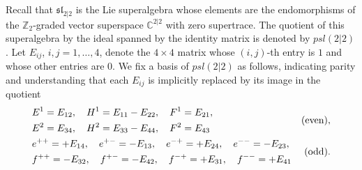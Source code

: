 \documentclass[10pt,a4paper]{amsart}
\numberwithin{equation}{section}
\newcommand{\fld}[1]{\mathbb{#1}} %
\newcommand{\alg}[1]{\mathfrak{#1}} %
\newcommand{\ZZ}{\fld{Z}}
\newcommand{\CC}{\fld{C}}
\newcommand{\SLSA}[3]{\alg{#1}_{#2 \vert #3}} %
\newcommand{\psl}{\SLSA{psl}{2}{2}}
\def\smash#1{#1}
\def\psl{psl(2|2)}
\begin{document}
Recall that \smash{$\SLSA{sl}{2}{2}$} is the Lie superalgebra whose elements are the endomorphisms of the $\ZZ_2$-graded vector superspace \smash{$\CC^{2\vert2}$} with zero supertrace.
The quotient of this superalgebra by the ideal spanned by the identity matrix is denoted by \smash{$\psl$}.
Let $E_{ij}$, $i,j=1,\dots,4$, denote the $4\times4$ matrix whose $(i,j)$-th entry is $1$ and whose other entries are $0$.
We fix a basis of \smash{$\psl$} as follows, indicating parity and understanding that each $E_{ij}$ is implicitly replaced by its image in the quotient%
\begin{equation}\label{eq:pslbasis}
	\begin{aligned}
	&	\begin{split}
			& E^1 = E_{12}, \quad H^1 = E_{11}-E_{22}, \quad F^1 = E_{21}, \\
			& E^2= E_{34}, \quad H^2 = E_{33}-E_{44}, \quad F^2 = E_{43}
		\end{split}
		& {\rm (even)}, \\
		& \begin{split}
		&	e^{++} = +E_{14}, \quad e^{+-} = -E_{13}, \quad e^{-+} = +E_{24}, \quad e^{--} = -E_{23}, \\
		&	f^{++} = -E_{32}, \quad f^{+-} = -E_{42}, \quad f^{-+} = +E_{31}, \quad f^{--} = +E_{41}
		\end{split}
		& {\rm (odd)}.
	\end{aligned}
\end{equation}
\end{document}
